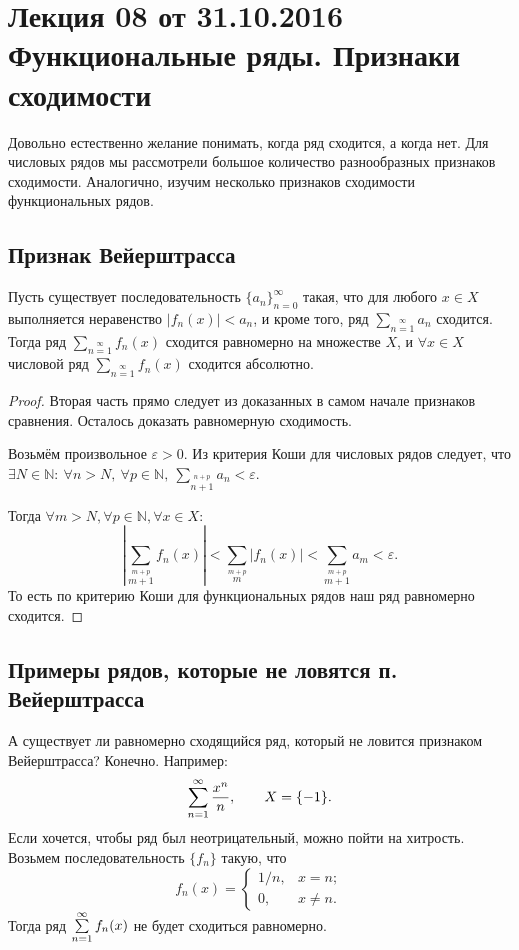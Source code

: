\documentclass[a4paper, 12pt]{article}
\begin{document}
\pagestyle{fancy}
\section{Лекция 08 от 31.10.2016 \\ Функциональные ряды. Признаки сходимости}
	
	Довольно естественно желание понимать, когда ряд сходится, а когда нет. Для числовых рядов мы рассмотрели большое количество разнообразных признаков сходимости. Аналогично, изучим несколько признаков сходимости функциональных рядов.
	
	\subsection{Признак Вейерштрасса}
	
	\begin{Test}
		
		Пусть существует последовательность $\{a_n\}_{n=0}^\infty$ такая, что для любого $x\in X$ выполняется неравенство $|f_n(x)|<a_n$, и кроме того, ряд $\sum_{n=1}\limits^{\infty}a_n$ сходится. Тогда ряд $\sum_{n=1}\limits^{\infty}f_n(x)$ сходится равномерно на множестве $X$, и $\forall x \in X$ числовой ряд $\sum_{n=1}\limits^{\infty}f_n(x)$ сходится абсолютно.
	\end{Test}
	
	\begin{proof}
		Вторая часть прямо следует из доказанных в самом начале признаков сравнения. Осталось доказать равномерную сходимость.
		
		Возьмём произвольное $\varepsilon>0$. Из критерия Коши для числовых рядов следует, что $\exists N\in \mathbb{N}: \ \forall n>N, \ \forall p\in \mathbb{N}, \ \sum_{n+1}\limits^{n+p}a_n < \varepsilon$.
		
		Тогда $\forall m>N, \forall p\in \mathbb{N}, \forall x \in X:$
		\[
		\left| \sum_{m+1}\limits^{m+p}f_n(x)\right|  < \sum_{m}\limits^{m+p} |f_n(x)| <  \sum_{m+1}\limits^{m+p}a_m < \varepsilon.
		\]
		То есть по критерию Коши для функциональных рядов наш ряд равномерно сходится.
	\end{proof}
	
	\subsection{Примеры рядов, которые не ловятся п. Вейерштрасса}
	
	А существует ли равномерно сходящийся ряд, который не ловится признаком Вейерштрасса? Конечно. Например:
	$$
	\sum\limits_{n=1}^{\infty} \frac{x^n}{n}, \qquad X = \{-1\}.
	$$
	Если хочется, чтобы ряд был неотрицательный, можно пойти на хитрость. Возьмем последовательность $\{f_n\}$ такую, что
	$$
	f_n(x) = \begin{cases}
	1/n, & x = n; \\
	0, & x \neq n.
	\end{cases}
	$$
	Тогда ряд $\sum\limits_{n=1}^{\infty} f_n(x)$ не будет сходиться равномерно.
	
\end{document}
